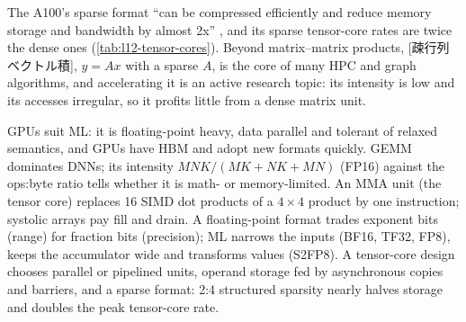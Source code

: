 \documentclass[../main.tex]{subfiles}
\begin{document}
The A100's sparse format \enquote{can be compressed efficiently and
reduce memory storage and bandwidth by almost 2x}
\cite{nvidia2020ampere}, and its sparse tensor-core rates are twice the
dense ones (\cref{tab:l12-tensor-cores}).  Beyond
matrix--matrix products,
[疎行列ベクトル積],
$y = Ax$ with a sparse $A$, is the core of many HPC and graph
algorithms, and accelerating it is an active research topic: its
intensity is low and its accesses irregular, so it profits little from
a dense matrix unit.

\begin{keypoint}
  GPUs suit ML: it is floating-point heavy, data parallel and tolerant
  of relaxed semantics, and GPUs have HBM and adopt new formats quickly.
  GEMM dominates DNNs; its intensity $MNK/(MK + NK + MN)$ (FP16) against
  the ops:byte ratio tells whether it is math- or memory-limited.  An
  MMA unit (the tensor core) replaces 16 SIMD dot products of a
  $4 \times 4$ product by one instruction; systolic arrays pay fill and
  drain.  A floating-point format trades exponent bits (range) for
  fraction bits (precision); ML narrows the inputs (BF16, TF32, FP8),
  keeps the accumulator wide and transforms values (S2FP8).  A
  tensor-core design chooses parallel or pipelined units, operand
  storage fed by asynchronous copies and barriers, and a sparse format:
  2:4 structured sparsity nearly halves storage and doubles the peak
  tensor-core rate.
\end{keypoint}
\end{document}
